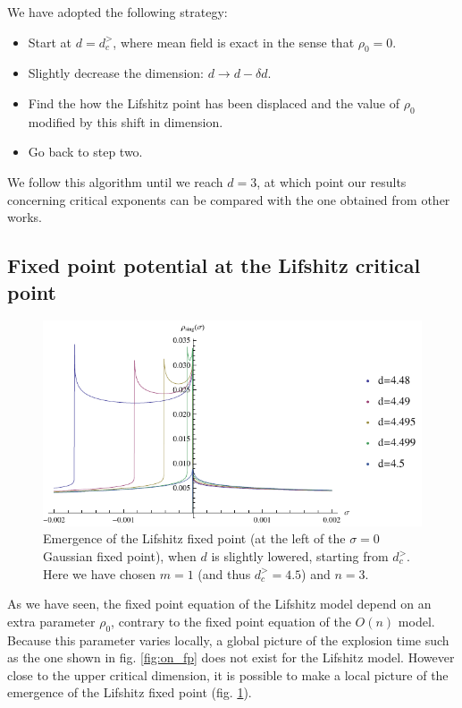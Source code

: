 We have adopted the following strategy:
\begin{itemize}
\item Start at $d=d_c^>$, where mean field is exact in the sense that $\rho_0 = 0$.
\item Slightly decrease the dimension: $d \rightarrow d - \delta d$. 
\item Find the how the Lifshitz point has been displaced and the value of $\rho_0$ modified by this shift in dimension.
\item Go back to step two.
\end{itemize}
We follow this algorithm until we reach $d=3$, at which point our results concerning critical exponents can be compared with the one obtained from other works.

\subsection{Fixed point potential at the Lifshitz critical point}

\begin{figure}[htp]
\begin{center}
\includegraphics[scale=1]{img/chap4/emergence_lif.pdf}
\caption{Emergence of the Lifshitz fixed point (at the left of the $\sigma = 0$ Gaussian fixed point), when $d$ is slightly lowered, starting from $d_c^>$. Here we have chosen $m=1$ (and thus $d_c^> = 4.5$) and $n=3$.}
\label{fig:emergence_lif}
\end{center}
\end{figure}

As we have seen, the fixed point equation of the Lifshitz model depend on an extra parameter $\rho_0$, contrary to the fixed point equation of the $O(n)$ model. Because this parameter varies locally, a global picture of the explosion time such as the one shown in fig.  \ref{fig:on_fp} does not exist for the Lifshitz model. However close to the upper critical dimension, it is possible to make a local picture of the emergence of the Lifshitz fixed point (fig. \ref{fig:emergence_lif}).

